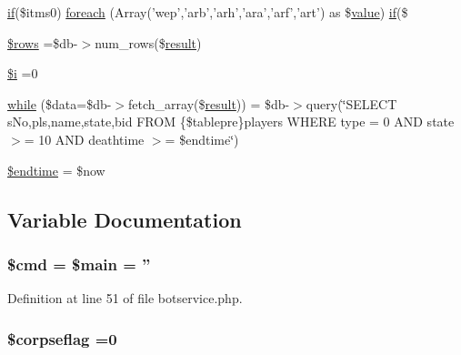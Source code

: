 \begin{DoxyCompactItemize}
\hyperlink{login__old_8php_a4ac1118c2e44c513a674bc1793ba6c90}{if}(\$itms0) \hyperlink{botservice_8php_a38ecd1c3a346f8a22ecd29f0de0cc1dc}{foreach} (Array('wep','arb','arh','ara','arf','art') as \$\hyperlink{1__chat_8tpl_8php_afcc7a4b78ecd8fa7e713f8cfa0f51017}{value}) \hyperlink{login__old_8php_a4ac1118c2e44c513a674bc1793ba6c90}{if}(\$
\item 
\hyperlink{botservice_8php_ace2ec39e7df3899fa8df9640ec274b03}{\$rows} =\$db-\/$>$num\+\_\+rows(\$\hyperlink{templates_2install_8php_abdecde238169a1e34f68354fc9968af0}{result})
\item 
\hyperlink{botservice_8php_a83018d9153d17d91fbcf3bc10158d34f}{\$i} =0
\item 
\hyperlink{botservice_8php_a9397939c237959113b21e7e4a5de37cb}{while} (\$data=\$db-\/$>$fetch\+\_\+array(\$\hyperlink{templates_2install_8php_abdecde238169a1e34f68354fc9968af0}{result})) = \$db-\/$>$query(\char`\"{}S\+E\+L\+E\+C\+T s\+No,pls,name,state,bid F\+R\+O\+M \{\$tablepre\}players W\+H\+E\+R\+E type = 0 A\+N\+D state $>$= 10 A\+N\+D deathtime $>$= \$endtime\char`\"{})
\item 
\hyperlink{botservice_8php_a4de03a8ac30b9635a8a8ea4a995be9ec}{\$endtime} = \$now
\end{DoxyCompactItemize}


\subsection{Variable Documentation}
\hypertarget{botservice_8php_a9c87033fa49b61f753e3c263da5edeab}{
\subsubsection[{\$cmd}]{\setlength{\rightskip}{0pt plus 5cm}\$cmd = \$main = ''}}\label{botservice_8php_a9c87033fa49b61f753e3c263da5edeab}


Definition at line 51 of file botservice.\+php.

\hypertarget{botservice_8php_ade2ba55b59e890fd631c6600a0b25bbe}{
\subsubsection[{\$corpseflag}]{\setlength{\rightskip}{0pt plus 5cm}\$corpseflag =0}}\label{botservice_8php_ade2ba55b59e890fd631c6600a0b25bbe}



